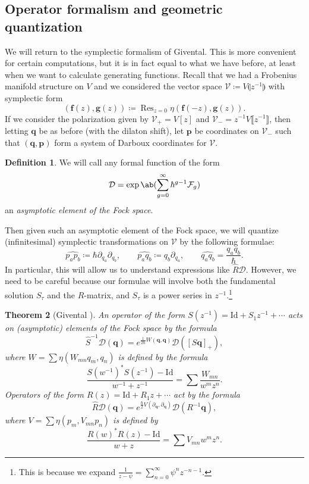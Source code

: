 \documentclass{amsart}
\newtheorem{thm}{Theorem}[section]
\theoremstyle{definition}
\newtheorem{defn}[thm]{Definition}
\theoremstyle{remark}
\theoremstyle{plain}
\theoremstyle{definition}
\theoremstyle{remark}
\newcommand{\mc}[1]{\mathcal{#1}}
\newcommand{\mbf}[1]{\mathbf{#1}}
\newcommand{\bq}{\mbf{q}}
\newcommand{\bp}{\mbf{p}}
\newcommand{\mr}[1]{\mathrm{#1}}
\newcommand{\on}[1]{\operatorname{#1}}
\newcommand{\wh}[1]{\widehat{#1}}
\newcommand{\1}{\mathbf{1}}
\newcommand{\2}{\mathbf{2}}
\newcommand{\3}{\mathbf{3}}
\newcommand{\ps}[1]{\llbracket #1 \rrbracket}
\newcommand{\ls}[1]{\llparenthesis #1 \rrparenthesis}
\begin{document}
\subsection{Operator formalism and geometric quantization}%
\label{sub:Operator formalism and geometric quantization}

We will return to the symplectic formalism of Givental. This is more convenient for certain computations, but it is in fact equal to what we have before, at least when we want to calculate generating functions. Recall that we had a Frobenius manifold structure on $V$ and we considered the vector space $\mc{V}\coloneqq V\ls{z^{-1}}$ with symplectic form
\[ (\mbf{f}(z), \mbf{g}(z)) \coloneqq \on{Res}_{z=0} \eta(\mbf{f}(-z), \mbf{g}(z)). \]
If we consider the polarization given by $\mc{V}_+ = V[z]$ and $\mc{V}_- = z^{-1}V\ps{z^{-1}}$, then letting $\bq$ be as before (with the dilaton shift), let $\bp$ be coordinates on $\mc{V}_-$ such that $(\bq, \bp)$ form a system of Darboux coordinates for $\mc{V}$.

\begin{defn}
    We will call any formal function of the form
    \[ \mc{D} = \exp\ab(\sum_{g=0}^{\infty} \hbar^{g-1} \mc{F}_g) \]
    an \textit{asymptotic element of the Fock space}.
\end{defn}

Then given such an asymptotic element of the Fock space, we will quantize (infinitesimal) symplectic transformations on $\mc{V}$ by the following formulae:
\[ \wh{p_a p_b} \coloneqq \hbar \partial_{q_a} \partial_{q_b}, \qquad \wh{p_a q_b} \coloneqq q_b \partial_{q_a}, \qquad \wh{q_a q_b} = \frac{q_a q_b}{\hbar}. \]
In particular, this will allow us to understand expressions like $\hat{R} \mc{D}$. However, we need to be careful because our formulae will involve both the fundamental solution $S_{\tau}$ and the $R$-matrix, and $S_{\tau}$ is a power series in $z^{-1}$.\footnote{This is because we expand $\frac{1}{z-\psi} = \sum_{n=0}^{\infty} \psi^n z^{-n-1}$.}

\begin{thm}[Givental {\cite{Givental2001quantization}}]
    An operator of the form $S(z^{-1}) = \mr{Id} + S_1 z^{-1} + \cdots$ acts on (asymptotic) elements of the Fock space by the formula
    \[ \hat{S}^{-1} \mc{D}(\bq) = e^{\frac{1}{2\hbar}W(\bq,\bq)} \mc{D}([S \bq]_+), \]
    where $W = \sum \eta(W_{mn}q_m, q_n)$ is defined by the formula
    \[ \frac{S(w^{-1})^* S(z^{-1}) - \mr{Id}}{w^{-1}+z^{-1}} = \sum \frac{W_{mn}}{w^m z^n}. \]
    Operators of the form $R(z) = \mr{Id} + R_1 z + \cdots$ act by the formula
    \[ \hat{R}\mc{D}(\bq) = e^{\frac{\hbar}{2} V(\partial_{\bq}, \partial_{\bq})} \mc{D}(R^{-1} \bq), \]
    where $V = \sum \eta(p_m, V_{mn} p_n)$ is defined by 
    \[ \frac{R(w)^* R(z) - \mr{Id}}{w+z} = \sum V_{mn} w^m z^n. \]
\end{thm}
\end{document}
